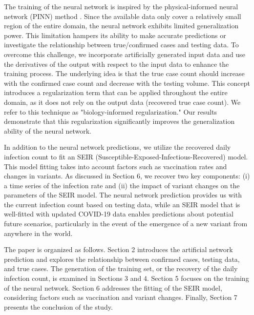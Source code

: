 \documentclass[sn-mathphys,Numbered]{sn-jnl}
\begin{document}
The training of the neural network is inspired by the physical-informed neural network (PINN) method \cite{PINN}. Since the available data only cover a relatively small region of the entire domain, the neural network exhibits limited generalization power. This limitation hampers its ability to make accurate predictions or investigate the relationship between true/confirmed cases and testing data. To overcome this challenge, we incorporate artificially generated input data and use the derivatives of the output with respect to the input data to enhance the training process. The underlying idea is that the true case count should increase with the confirmed case count and decrease with the testing volume. This concept introduces a regularization term that can be applied throughout the entire domain, as it does not rely on the output data (recovered true case count). We refer to this technique as "biology-informed regularization." Our results demonstrate that this regularization significantly improves the generalization ability of the neural network. 

In addition to the neural network predictions, we utilize the recovered daily infection count to fit an SEIR (Susceptible-Exposed-Infectious-Recovered) model. This model fitting takes into account factors such as vaccination rates and changes in variants. As discussed in Section 6, we recover two key components: (i) a time series of the infection rate and (ii) the impact of variant changes on the parameters of the SEIR model. The neural network prediction provides us with the current infection count based on testing data, while an SEIR model that is well-fitted with updated COVID-19 data enables predictions about potential future scenarios, particularly in the event of the emergence of a new variant from anywhere in the world.

The paper is organized as follows. Section 2 introduces the artificial network prediction and explores the relationship between confirmed cases, testing data, and true cases. The generation of the training set, or the recovery of the daily infection count, is examined in Sections 3 and 4. Section 5 focuses on the training of the neural network. Section 6 addresses the fitting of the SEIR model, considering factors such as vaccination and variant changes. Finally, Section 7 presents the conclusion of the study.
\end{document}
